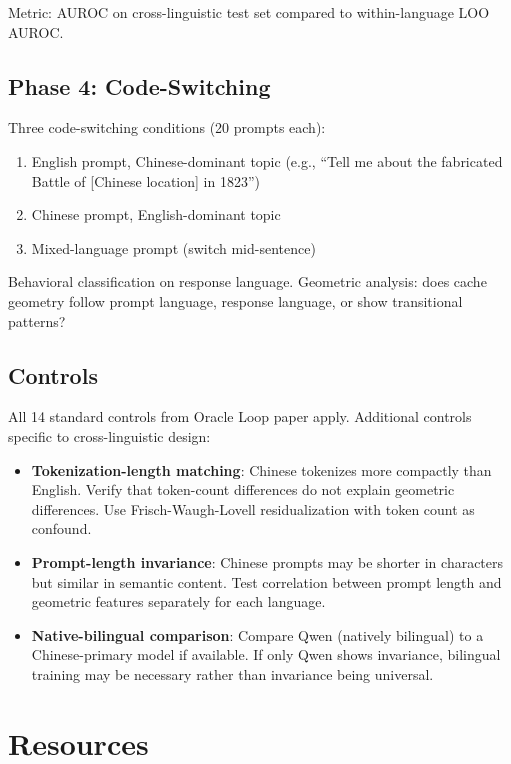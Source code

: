 \documentclass[11pt,letterpaper]{article}
\begin{document}
\noindent Metric: AUROC on cross-linguistic test set compared to within-language LOO AUROC.

\subsection{Phase 4: Code-Switching}

Three code-switching conditions (20 prompts each):
\begin{enumerate}[leftmargin=*]
  \item English prompt, Chinese-dominant topic (e.g., ``Tell me about the fabricated Battle of [Chinese location] in 1823'')
  \item Chinese prompt, English-dominant topic
  \item Mixed-language prompt (switch mid-sentence)
\end{enumerate}

\noindent Behavioral classification on response language. Geometric analysis: does cache geometry follow prompt language, response language, or show transitional patterns?

\subsection{Controls}

All 14 standard controls from Oracle Loop paper apply. Additional controls specific to cross-linguistic design:

\begin{itemize}
  \item \textbf{Tokenization-length matching}: Chinese tokenizes more compactly than English. Verify that token-count differences do not explain geometric differences. Use Frisch-Waugh-Lovell residualization with token count as confound.
  \item \textbf{Prompt-length invariance}: Chinese prompts may be shorter in characters but similar in semantic content. Test correlation between prompt length and geometric features separately for each language.
  \item \textbf{Native-bilingual comparison}: Compare Qwen (natively bilingual) to a Chinese-primary model if available. If only Qwen shows invariance, bilingual training may be necessary rather than invariance being universal.
\end{itemize}

\section{Resources}
\end{document}
